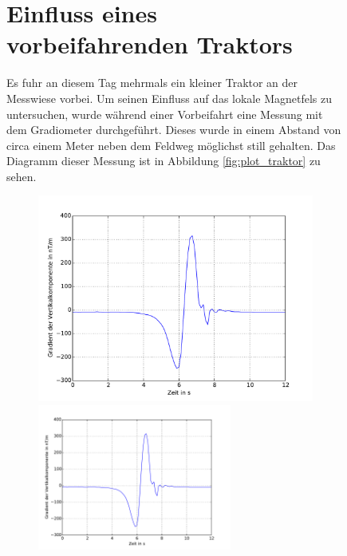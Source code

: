 \begin{figure}[!ht]



\section{Einfluss eines vorbeifahrenden Traktors}

Es fuhr an diesem Tag mehrmals ein kleiner Traktor an der Messwiese vorbei. Um seinen Einfluss auf das lokale Magnetfels zu untersuchen, wurde während einer Vorbeifahrt eine Messung mit dem Gradiometer durchgeführt. Dieses wurde in einem Abstand von circa einem Meter neben dem Feldweg möglichst still gehalten. Das Diagramm dieser Messung ist in Abbildung \ref{fig:plot_traktor} zu sehen.

\begin{figure}[!ht]
 \centering

 \includegraphics[width=\textwidth]{fig/traktor_ausschnitt.pdf}

 \includegraphics[width=0.7\textwidth]{fig/traktor_ausschnitt.pdf}


\end{figure}
\end{figure}
